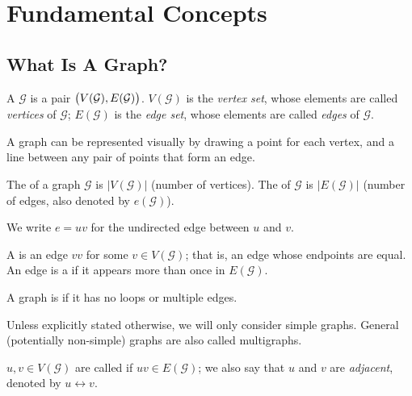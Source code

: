 \chapter{Fundamental Concepts}
\section{What Is A Graph?}
\begin{definition}[Graph]
A  $\mathcal{G}$ is a pair $\left(V(\mathcal{G}),E(\mathcal{G})\right)$. $V(\mathcal{G})$ is the \emph{vertex set}, whose elements are called \emph{vertices} of $\mathcal{G}$; $E(\mathcal{G})$ is the \emph{edge set}, whose elements are called \emph{edges} of $\mathcal{G}$.
\end{definition}

A graph can be represented visually by drawing a point for each vertex, and a line between any pair of points that form an edge.

\begin{definition}
The  of a graph $\mathcal{G}$ is $|V(\mathcal{G})|$ (number of vertices). The  of $\mathcal{G}$ is $|E(\mathcal{G})|$ (number of edges, also denoted by $e(\mathcal{G})$).
\end{definition}

\begin{notation}
We write $e=uv$ for the undirected edge between $u$ and $v$.
\end{notation}

\begin{definition}
A  is an edge $vv$ for some $v\in V(\mathcal{G})$; that is, an edge whose endpoints are equal. An edge is a  if it appears more than once in $E(\mathcal{G})$.

A graph is  if it has no loops or multiple edges.
\end{definition}

\begin{remark}
Unless explicitly stated otherwise, we will only consider simple graphs. General (potentially non-simple) graphs are also called multigraphs.
\end{remark}

\begin{definition}
$u,v\in V(\mathcal{G})$ are called  if $uv\in E(\mathcal{G})$; we also say that $u$ and $v$ are \emph{adjacent}, denoted by $u\leftrightarrow v$.
\end{definition}


